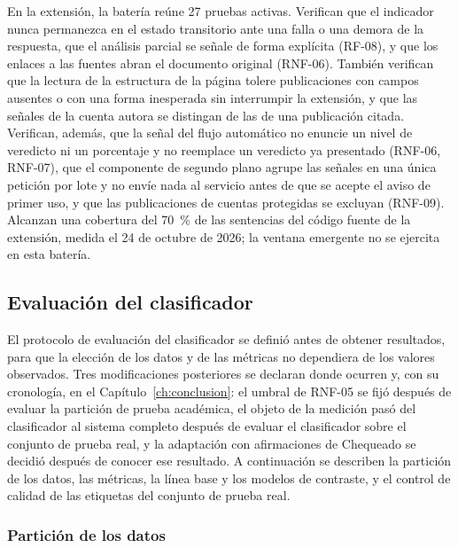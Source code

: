 En la extensión, la batería reúne 27 pruebas activas. Verifican que el indicador nunca permanezca en el estado transitorio ante una falla o una demora de la respuesta, que el análisis parcial se señale de forma explícita (RF-08), y que los enlaces a las fuentes abran el documento original (RNF-06). También verifican que la lectura de la estructura de la página tolere publicaciones con campos ausentes o con una forma inesperada sin interrumpir la extensión, y que las señales de la cuenta autora se distingan de las de una publicación citada. Verifican, además, que la señal del flujo automático no enuncie un nivel de veredicto ni un porcentaje y no reemplace un veredicto ya presentado (RNF-06, RNF-07), que el componente de segundo plano agrupe las señales en una única petición por lote y no envíe nada al servicio antes de que se acepte el aviso de primer uso, y que las publicaciones de cuentas protegidas se excluyan (RNF-09). Alcanzan una cobertura del 70~\% de las sentencias del código fuente de la extensión, medida el 24 de octubre de 2026; la ventana emergente no se ejercita en esta batería.

\subsection{Evaluación del clasificador}
\label{sec:evaluacion-clasificador}

El protocolo de evaluación del clasificador se definió antes de obtener resultados, para que la elección de los datos y de las métricas no dependiera de los valores observados. Tres modificaciones posteriores se declaran donde ocurren y, con su cronología, en el Capítulo~\ref{ch:conclusion}: el umbral de RNF-05 se fijó después de evaluar la partición de prueba académica, el objeto de la medición pasó del clasificador al sistema completo después de evaluar el clasificador sobre el conjunto de prueba real, y la adaptación con afirmaciones de Chequeado se decidió después de conocer ese resultado. A continuación se describen la partición de los datos, las métricas, la línea base y los modelos de contraste, y el control de calidad de las etiquetas del conjunto de prueba real.

\subsubsection{Partición de los datos}

